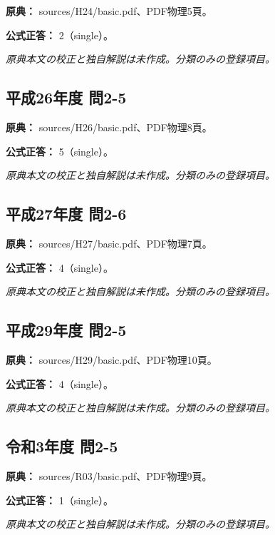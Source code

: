 \noindent\textbf{原典：} sources/H24/basic.pdf、PDF物理5頁。

\textbf{公式正答：} 2（single）。

\par\textit{原典本文の校正と独自解説は未作成。分類のみの登録項目。}

\subsection{平成26年度 問2-5}
\label{q:h26-reg-basic-2-5}

\noindent\textbf{原典：} sources/H26/basic.pdf、PDF物理8頁。

\textbf{公式正答：} 5（single）。

\par\textit{原典本文の校正と独自解説は未作成。分類のみの登録項目。}

\subsection{平成27年度 問2-6}
\label{q:h27-reg-basic-2-6}

\noindent\textbf{原典：} sources/H27/basic.pdf、PDF物理7頁。

\textbf{公式正答：} 4（single）。

\par\textit{原典本文の校正と独自解説は未作成。分類のみの登録項目。}

\subsection{平成29年度 問2-5}
\label{q:h29-reg-basic-2-5}

\noindent\textbf{原典：} sources/H29/basic.pdf、PDF物理10頁。

\textbf{公式正答：} 4（single）。

\par\textit{原典本文の校正と独自解説は未作成。分類のみの登録項目。}

\subsection{令和3年度 問2-5}
\label{q:r03-reg-basic-2-5}

\noindent\textbf{原典：} sources/R03/basic.pdf、PDF物理9頁。

\textbf{公式正答：} 1（single）。

\par\textit{原典本文の校正と独自解説は未作成。分類のみの登録項目。}


